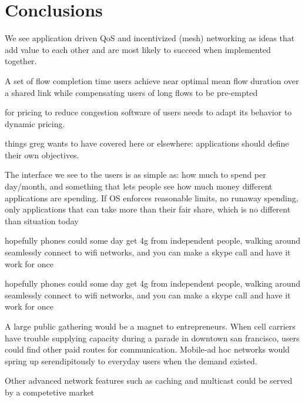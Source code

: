 \section{Conclusions}
We see application driven QoS and incentivized (mesh) networking as ideas that add value to each other and are most likely to succeed when implemented together.

A set of flow completion time users achieve near optimal mean flow duration over a shared link while compensating users of long flows to be pre-empted

for pricing to reduce congestion software of users needs to adapt its behavior to dynamic pricing.

things greg wants to have covered here or elsewhere:
applications should define their own objectives.

The interface we see to the users is as simple as: how much to spend per day/month, and something that lets people see how much money different applications are spending. If OS enforces reasonable limits, no runaway spending, only applications that can take more than their fair share, which is no different than situation today

hopefully phones could some day get 4g from independent people, walking around seamlessly connect to wifi networks, and you can make a skype call and have it work for once

hopefully phones could some day get 4g from independent people, walking around seamlessly connect to wifi networks, and you can make a skype call and have it work for once

A large public gathering would be a magnet to entrepreneurs. When cell carriers have trouble supplying capacity during a parade in downtown san francisco, users could find other paid routes for communication. Mobile-ad hoc networks would spring up serendipitously to everyday users when the demand existed.

Other advanced network features such as caching and multicast could be served by a competetive market
\label{sec:conc}
